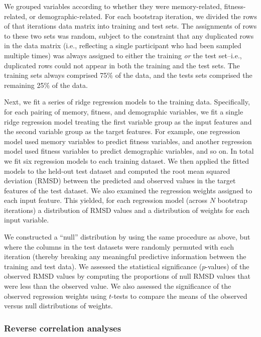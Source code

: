 \documentclass[10pt]{article}
\begin{document}
We grouped variables according to whether they were memory-related,
fitness-related, or demographic-related.  For each bootstrap
iteration, we divided the rows of that iterations data matrix into
training and test sets.  The assignments of rows to these two sets was
random, subject to the constraint that any duplicated rows in the data
matrix (i.e., reflecting a single participant who had been sampled
multiple times) was always assigned to either the training \textit{or}
the test set--i.e., duplicated rows could not appear in both the
training and the test sets.  The training sets always comprised 75\%
of the data, and the tests sets comprised the remaining 25\% of the
data.

Next, we fit a series of ridge regression models to the training
data.  Specifically, for each pairing of memory, fitness, and
demographic variables, we fit a single ridge regression model treating
the first variable group as the input features and the second variable
group as the target features.  For example, one regression model used
memory variables to predict fitness variables, and another regression
model used fitness variables to predict demographic variables, and so
on.  In total we fit six regression models to each training dataset.
We then applied the fitted models to the held-out test dataset and
computed the root mean squared deviation (RMSD) between the predicted and
observed values in the target features of the test dataset.  We also
examined the regression weights assigned to each input feature.  This
yielded, for each regression model (across $N$ bootstrap iterations) a
distribution of RMSD values and a distribution of weights for each
input variable.

We constructed a ``null'' distribution by using the same procedure as above,
but where the columns in the test datasets were randomly permuted with
each iteration (thereby breaking any meaningful predictive information
between the training and test data).  We assessed the statistical
significance ($p$-values) of the observed RMSD values by computing the proportions
of null RMSD values that were less than the observed value.  We also
assessed the significance of the observed regression weights using
$t$-tests to compare the means of the observed versus null
distributions of weights.

\subsubsection*{Reverse correlation analyses}
\end{document}
